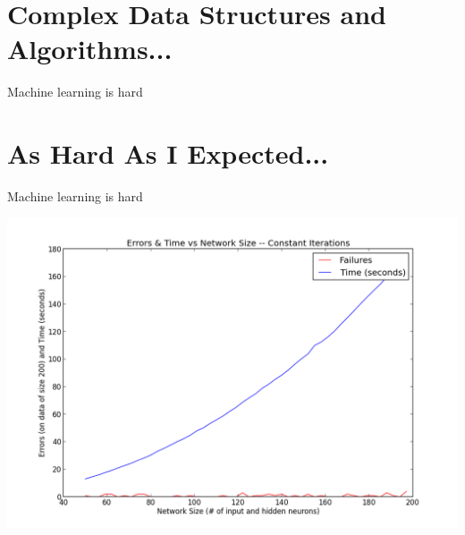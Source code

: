 \documentclass{article}
\begin{document}
\section{Complex Data Structures and Algorithms...}
    Machine learning is hard

\section{As Hard As I Expected...}
    Machine learning is hard


\begin{center}
\includegraphics[scale=0.6]{good_learning.png}
\end{center}
\end{document}
